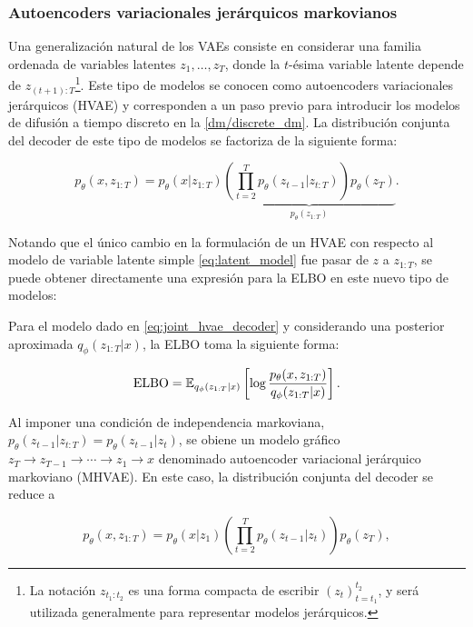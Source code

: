 \subsubsection{Autoencoders variacionales jerárquicos markovianos}

Una generalización natural de los VAEs consiste en considerar una familia ordenada de variables latentes $z_1,\ldots,z_T$, donde la $t$-ésima variable latente depende de $z_{(t+1):T}$\footnote{La notación $z_{t_1:t_2}$ es una forma compacta de escribir $(z_t)_{t=t_1}^{t_2}$, y será utilizada generalmente para representar modelos jerárquicos.}. Este tipo de modelos se conocen como autoencoders variacionales jerárquicos (HVAE) y corresponden a un paso previo para introducir los modelos de difusión a tiempo discreto en la \autoref{dm/discrete_dm}. La distribución conjunta del decoder de este tipo de modelos se factoriza de la siguiente forma:

\begin{equation}
    \label{eq:joint_hvae_decoder}
    p_\theta(x, z_{1:T})
    = p_\theta(x|z_{1:T})\underbrace{
        \left(\prod_{t=2}^{T} p_\theta(z_{t-1}|z_{t:T})\right)
        p_\theta(z_T)}_{p_\theta(z_{1:T})}.
\end{equation}

Notando que el único cambio en la formulación de un HVAE con respecto al modelo de variable latente simple \eqref{eq:latent_model} fue pasar de $z$ a $z_{1:T}$, se puede obtener directamente una expresión para la ELBO en este nuevo tipo de modelos:

\begin{prop}
    Para el modelo dado en \eqref{eq:joint_hvae_decoder} y considerando una posterior aproximada $q_\phi(z_{1:T}|x)$, la ELBO toma la siguiente forma:

    \begin{equation}
        \label{eq:elbo_mhvae}
        \operatorname{ELBO}
        = \mathbb{E}_{q_\phi(z_{1:T}|x)}\left[\log\frac{p_\theta(x,z_{1:T})}{q_\phi(z_{1:T}|x)}\right].
    \end{equation}
\end{prop}

Al imponer una condición de independencia markoviana, $p_\theta(z_{t-1}|z_{t:T})=p_\theta(z_{t-1}|z_t)$, se obiene un modelo gráfico $z_T\to z_{T-1}\to\cdots\to z_1\to x$ denominado autoencoder variacional jerárquico markoviano (MHVAE). En este caso, la distribución conjunta del decoder se reduce a

\begin{equation*}
    p_\theta(x, z_{1:T})
    = p_\theta(x|z_1)\left(\prod_{t=2}^{T}
    p_\theta(z_{t-1}|z_t)\right)
    p_\theta(z_T),
\end{equation*}

